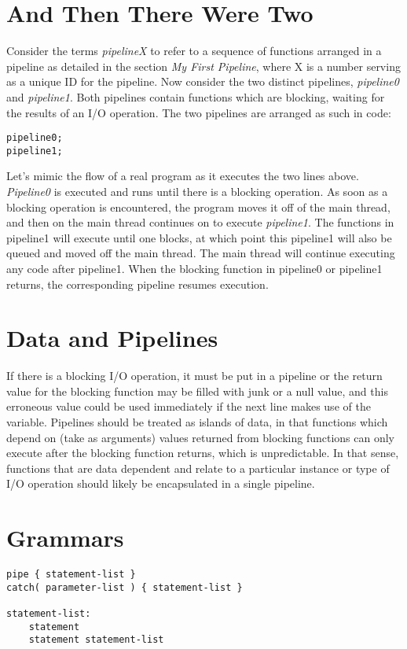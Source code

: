 \documentclass[./LRM_main.tex]{subfiles}
\begin{document}
\section{And Then There Were Two}
Consider the terms \textit{pipelineX} to refer to a sequence of functions arranged in a pipeline as detailed in the section \textit{My First Pipeline}, where X is a number serving as a unique ID for
the pipeline. Now consider the two distinct pipelines, \textit{pipeline0} and \textit{pipeline1}. Both pipelines contain functions which are blocking, waiting for the results of an I/O operation. The two pipelines are arranged as such in code:
\begin{lstlisting}
pipeline0;
pipeline1;
\end{lstlisting}
Let's mimic the flow of a real program as it executes the two lines above. \textit{Pipeline0} is executed and runs until there is a blocking operation. As soon as a blocking operation is encountered,
the program moves it off of the main thread, and then on the main thread continues on to execute \textit{pipeline1}. The functions in pipeline1 will execute until one blocks, at which point this pipeline1 will also be queued and moved off the main thread. The main thread will continue executing any code after pipeline1. When the blocking function in pipeline0 or pipeline1 returns, the corresponding pipeline resumes execution.   


\section{Data and Pipelines}
If there is a blocking I/O operation, it must be put in a pipeline or the return value for the blocking function may be filled with junk or a null value, and this erroneous value could be used immediately if the next line makes use of the variable. Pipelines should be treated as islands of data, in that functions which depend on (take as arguments) values returned from blocking functions can only execute after the blocking function returns, which is unpredictable. In that sense, functions that are data dependent and relate to a particular instance or type of I/O operation should likely be encapsulated in a single pipeline. 

\section{Grammars}
\begin{lstlisting}
pipe { statement-list }
catch( parameter-list ) { statement-list }

statement-list:
    statement
    statement statement-list
\end{lstlisting}
\end{document}
